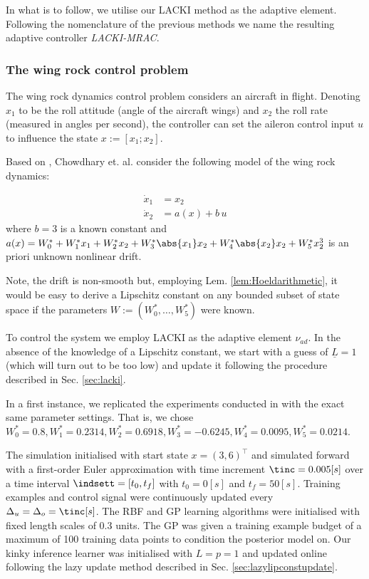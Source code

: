 In what is to follow, we utilise our LACKI method as the adaptive element. Following the nomenclature of the previous methods we name the resulting adaptive controller \textit{LACKI-MRAC}.

\subsubsection{The wing rock control problem}
The wing rock dynamics control problem considers an aircraft in flight. Denoting $x_1$ to be the roll attitude (angle of the aircraft wings) and $x_2$ the roll rate (measured in angles per second), the controller can set the aileron control input $u$ to influence the state $x := [x_1;x_2]$.

Based on \cite{Monahemi1996}, Chowdhary et. al. \cite{Chowdhary2013,ChowdharyCDC2013} consider the following model of the wing rock dynamics: 

\begin{align}
\dot x_1 &= x_2 \\
\dot x_2 &= a(x) + b \, u 
\end{align}
where $b =3$ is a known constant and 
$a(x) = W_0^* + W_1^* x_1 + W_2^* x_2 + W_3^* \abs{x_1} x_2 + W_4^* \abs{x_2} x_2 + W^*_5 x_2^3$ is an priori unknown nonlinear drift. 



Note, the drift is non-smooth but, employing Lem. \ref{lem:Hoeldarithmetic}, it would be easy to derive a Lipschitz constant on any bounded subset of state space if the parameters $W := (W_0^*,\ldots, W_5^*)$ were known.

To control the system we employ LACKI as the adaptive element $\nu_{ad}$.
In the absence of the knowledge of a Lipschitz constant, we start with a guess of $\underline L=1$ (which will turn out to be too low) and update it following the procedure described in Sec. \ref{sec:lacki}.

In a first instance, we replicated the experiments conducted in \cite{Chowdhary2013,chowdharyacc2013} with the exact same parameter settings. That is, we chose $W_0^* = 0.8, W_1^* = 0.2314, W_2^* = 0.6918, W_3^* = -0.6245, W_4^* = 0.0095, W_5^* = 0.0214$. 



The simulation initialised with start state $x = (3,6)^\top$ and simulated forward with a first-order Euler approximation with time increment $\tinc = 0.005 [s]$ over a time interval $\indsett = [t_0,t_f]$ with $t_0 = 0[s]$ and $t_f = 50[s]$. Training examples and control signal were continuously updated every $\Delta_u= \Delta_o = \tinc [s]$. The RBF and GP learning algorithms were initialised with fixed length scales of 0.3 units. The GP was given a training example budget of a maximum of 100 training data points to condition the posterior model on. Our kinky inference learner was initialised with $L =p= 1$ and updated online following the lazy update method described in Sec. \ref{sec:lazylipconstupdate}.

